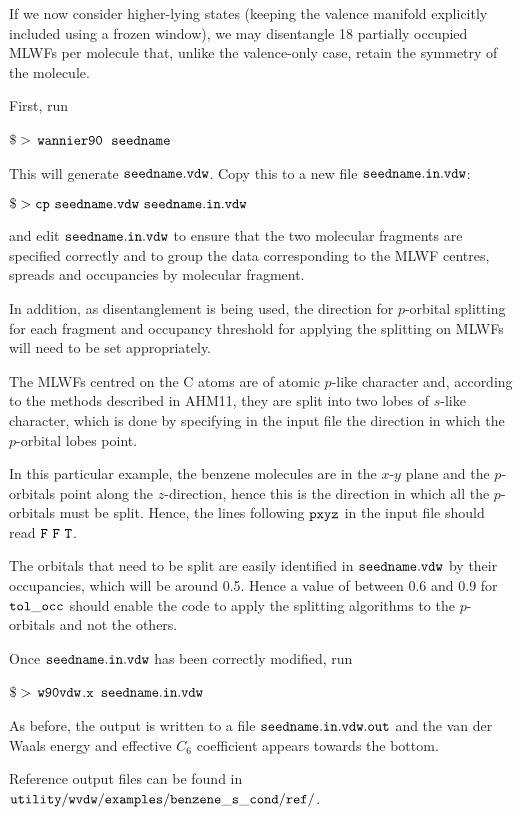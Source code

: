 \documentclass{report}
\newcommand{\wvdw}{{$\tt{w90vdw}$}}
\newcommand{\wannier}{{$\tt{wannier90}$}}
\begin{document}
If we now consider higher-lying states (keeping the valence manifold
explicitly included using a frozen window), we may disentangle 18
partially occupied MLWFs per molecule that, unlike the valence-only
case, retain the symmetry of the molecule. 

First, run 

$\tt{\$>}$ \wannier\ $\tt{seedname}$

This will generate $\tt{seedname.vdw}$. Copy this to a new file
$\tt{seedname.in.vdw}$:

$\tt{\$> cp\ seedname.vdw\ seedname.in.vdw}$

and edit $\tt{seedname.in.vdw}$ to ensure that the two molecular
fragments are specified correctly and to group the data corresponding
to the MLWF centres, spreads and occupancies by molecular fragment. 

In addition, as disentanglement is being used, the direction for
$p$-orbital splitting for each fragment and occupancy threshold for
applying the splitting on MLWFs will need to be set appropriately. 

The MLWFs centred on the C atoms are of atomic $p$-like character and, 
according to the methods described in AHM11, they are split into two
lobes of $s$-like character, which is done by specifying in the input file 
the direction in which the $p$-orbital lobes point. 

In this particular example, the benzene molecules are in
the $x$-$y$ plane and the $p$-orbitals point along the $z$-direction,
hence this is the direction in which all the $p$-orbitals must be
split. Hence, the lines following $\tt{pxyz}$ in the input file 
should read $\tt{F\ F\ T}$. 

The orbitals that need to be split are easily identified in
$\tt{seedname.vdw}$ by their occupancies, which will be around
0.5. Hence a value of between 0.6 and 0.9 for $\tt{tol\_occ}$ should
enable the code to apply the splitting algorithms to the $p$-orbitals
and not the others.

Once $\tt{seedname.in.vdw}$ has been correctly modified, run

$\tt{\$>}$ \wvdw$\tt{.x}$ $\tt{seedname.in.vdw}$

As before, the output is written to a file $\tt{seedname.in.vdw.out}$ 
and the van der Waals energy and effective $C_6$ coefficient appears 
towards the bottom.

Reference output files can be found in  
$\tt{utility/wvdw/examples/benzene\_s\_cond/ref/}$.
\end{document}
